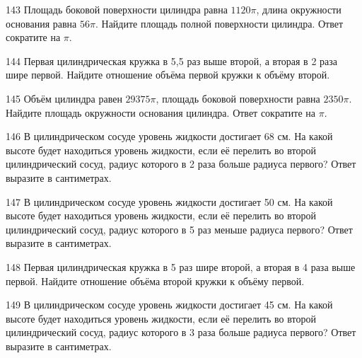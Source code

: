 \documentclass[4apaper]{article}
\begin{document}
\begin{taskBN}{143}
Площадь боковой поверхности цилиндра равна $1120\pi$, длина окружности основания равна $56\pi$. Найдите площадь полной поверхности цилиндра. Ответ сократите на $\pi$.
\end{taskBN}

\begin{taskBN}{144}
 Первая цилиндрическая кружка в 5,5 раз выше второй, а вторая в 2 раза шире первой. Найдите отношение объёма первой кружки к объёму второй.
\end{taskBN}

\begin{taskBN}{145}
Объём цилиндра равен $29375\pi$, площадь боковой поверхности равна $2350\pi$. Найдите площадь окружности основания цилиндра. Ответ сократите на $\pi$.
\end{taskBN}

\begin{taskBN}{146}
В цилиндрическом сосуде уровень жидкости достигает 68 см. На какой высоте будет находиться уровень жидкости, если её перелить во второй цилиндрический сосуд, радиус которого в 2 раза больше радиуса первого? Ответ выразите в сантиметрах.
\end{taskBN}

\begin{taskBN}{147}
В цилиндрическом сосуде уровень жидкости достигает 50 см. На какой высоте будет находиться уровень жидкости, если её перелить во второй цилиндрический сосуд, радиус которого в 5 раз меньше радиуса первого? Ответ выразите в сантиметрах.
\end{taskBN}

\begin{taskBN}{148}
 Первая цилиндрическая кружка в 5 раз шире второй, а вторая в 4 раза выше первой. Найдите отношение объёма второй кружки к объёму первой.
\end{taskBN}

\begin{taskBN}{149}
В цилиндрическом сосуде уровень жидкости достигает 45 см. На какой высоте будет находиться уровень жидкости, если её перелить во второй цилиндрический сосуд, радиус которого в 3 раза больше радиуса первого? Ответ выразите в сантиметрах.
\end{taskBN}
\end{document}

